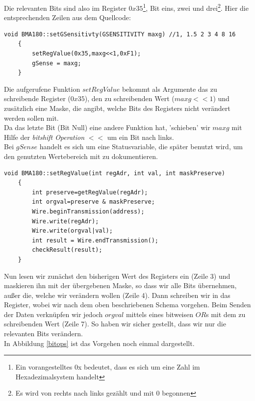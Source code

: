 \documentclass[12pt,a4paper]{scrartcl}
\begin{document}
Die relevanten Bits sind also im Register $0x35$\footnote{Ein vorangestelltes 0x bedeutet, dass es sich um eine Zahl im Hexadezimalsystem handelt}, Bit eins, zwei und drei\footnote{Es wird von rechts nach links gezählt und mit 0 begonnen}. Hier die entsprechenden Zeilen aus dem Quellcode:

\lstset{frameround=fttt}
\begin{lstlisting}[frame=trBL]
	void BMA180::setGSensitivty(GSENSITIVITY maxg) //1, 1.5 2 3 4 8 16
	{
	    setRegValue(0x35,maxg<<1,0xF1);
	    gSense = maxg;
	}
\end{lstlisting}
 
Die aufgerufene Funktion $setRegValue$ bekommt als Argumente das zu schreibende Register ($0x35$), den zu schreibenden Wert ($maxg << 1$) und zusätzlich eine Maske, die angibt, welche Bits des Registers nicht verändert werden sollen mit.\\
Da das letzte Bit (Bit Null) eine andere Funktion hat, 'schieben' wir $maxg$ mit Hilfe der \textit{bitshift Operation} $<<$ um ein Bit nach links.\\
Bei $gSense$ handelt es sich um eine Statusvariable, die später benutzt wird, um den genutzten Wertebereich mit zu dokumentieren.\\


\begin{lstlisting}[frame=trBL]
	void BMA180::setRegValue(int regAdr, int val, int maskPreserve)
	{
	    int preserve=getRegValue(regAdr);	
	    int orgval=preserve & maskPreserve;
	    Wire.beginTransmission(address);
	    Wire.write(regAdr);
	    Wire.write(orgval|val);
	    int result = Wire.endTransmission();
	    checkResult(result);
	}
\end{lstlisting}

Nun lesen wir zunächst den bisherigen Wert des Registers ein (Zeile 3)  und maskieren ihn mit der übergebenen Maske, so dass wir alle Bits übernehmen, außer die, welche wir verändern wollen (Zeile 4). Dann schreiben wir in das Register, wobei wir nach dem oben beschriebenen Schema vorgehen. Beim Senden der Daten verknüpfen wir jedoch $orgval$ mittels eines bitweisen $OR$s mit dem zu schreibenden Wert (Zeile 7). So haben wir sicher gestellt, dass wir nur die relevanten Bits verändern.\\
In Abbildung \ref{bitops} ist das Vorgehen noch einmal dargestellt.
\end{document}

